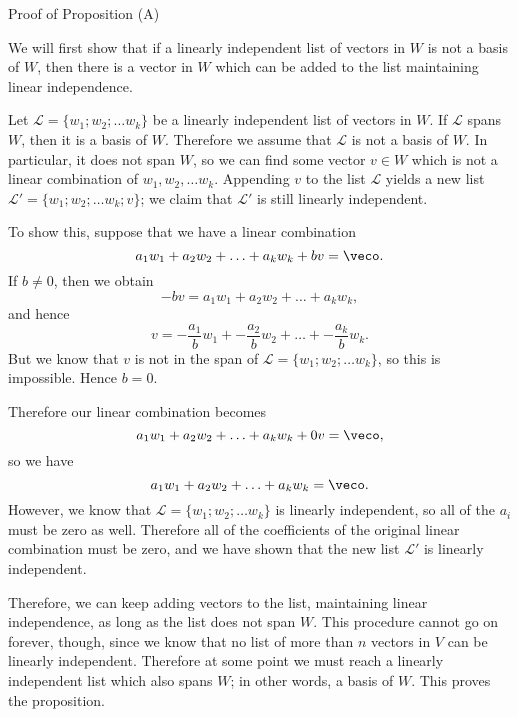 \begin{edXshowhide}{Proof of Proposition (A)}

We will first show that if a linearly independent list of vectors in $W$ is not a basis of $W$, then
there is a vector in $W$ which can be added to the list maintaining linear independence.  

Let $\mathcal{L} = \{w_1; w_2; \ldots w_k\}$ be a linearly independent list of vectors in $W$.  If
$\mathcal{L}$ spans $W$, then it is a basis of $W$.  Therefore we assume that $\mathcal{L}$ is not
a basis of $W$.  In particular, it does not span $W$, so we can find some vector $v\in W$ which is
not a linear combination of $w_1, w_2, \ldots w_k$.  Appending $v$ to the list $\mathcal{L}$
yields a new list $\mathcal{L'}=\{w_1; w_2; \ldots w_k; v\}$; we claim that $\mathcal{L'}$ 
 is still linearly independent.  
 
To show this, suppose that we have a linear combination
\[a_1w_1 + a_2w_2 + \ldots + a_k w_k + bv = \veco.\]  
If $b\ne 0$, then we obtain
\[ -bv = a_1w_1 + a_2w_2 + \ldots + a_k w_k,\]
and hence 
\[v = -\frac{a_1}{b}w_1 + -\frac{a_2}{b}w_2 + \ldots + -\frac{a_k}{b}w_k.\]
But we know that $v$ is not in the span of $\mathcal{L}=\{w_1; w_2; \ldots w_k\}$, so this is impossible.  
Hence $b = 0$.  

Therefore our linear combination becomes
\[a_1w_1 + a_2w_2 + \ldots + a_k w_k + 0v = \veco,\] 
so we have 
\[a_1w_1 + a_2w_2 + \ldots + a_k w_k  = \veco.\] 
However, we know that $\mathcal{L}=\{w_1; w_2; \ldots w_k\}$ is linearly independent, so all
of the $a_i$ must be zero as well.  Therefore all of the coefficients of the original linear combination
must be zero, and we have shown that the new list $\mathcal{L'}$ is linearly independent.  

Therefore, we can keep adding vectors to the list, maintaining
linear independence, as long as the list does not span $W$.  This procedure cannot go on forever, though,
since we know that no list of more than $n$ vectors in $V$ can be linearly independent.  Therefore
at some point we must reach a linearly independent list which also spans $W$; in other words, a basis
of $W$.  This proves the proposition.  

\end{edXshowhide}


